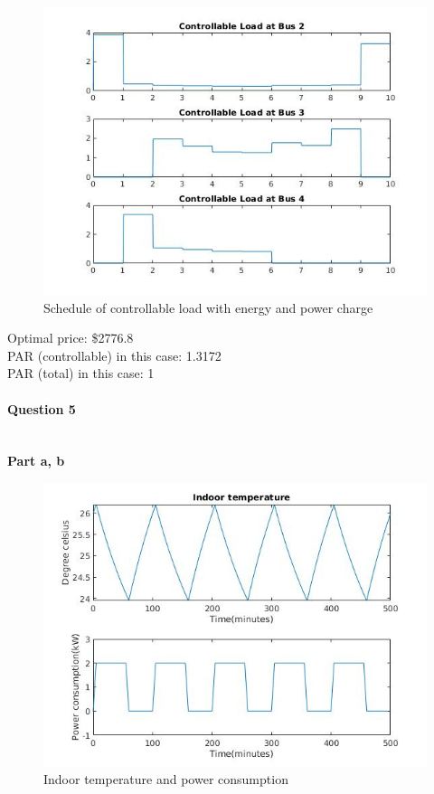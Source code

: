 \documentclass[11pt]{article}
\begin{document}
\begin{figure}[H]
    \centering
    \includegraphics[scale=0.6]{figs/q4.jpg}
    \caption{Schedule of controllable load with energy and power charge}
    \label{fig::q4}
\end{figure}

\noindent
Optimal price: \$2776.8   \\
PAR (controllable) in this case: 1.3172    \\
PAR (total) in this case: 1


\pagebreak
\paragraph{Question 5} \mbox{} \\
\textbf{Part a, b} \\
\begin{figure}[H]
    \centering
    \includegraphics[scale=0.6]{figs/q5_a.jpg}
    \caption{Indoor temperature and power consumption}
    \label{fig::q5a}
\end{figure}
\end{document}
